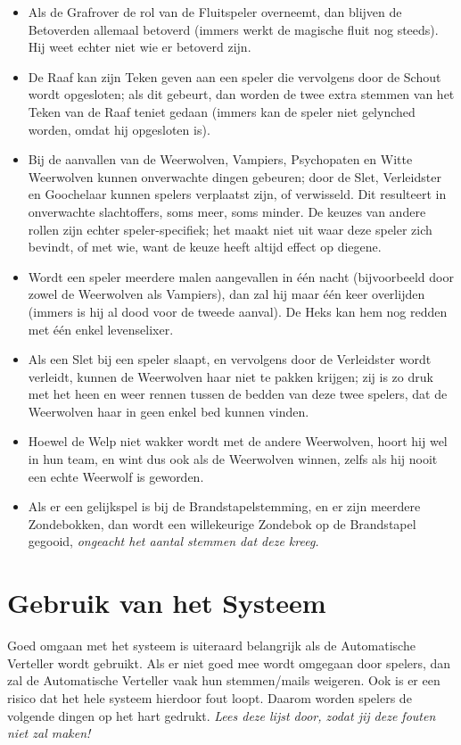 \documentclass[12pt]{article}
\begin{document}
\begin{itemize}
  	\item Als de Grafrover de rol van de Fluitspeler overneemt, dan blijven de Betoverden allemaal betoverd (immers werkt de magische fluit nog steeds). Hij weet echter niet wie er betoverd zijn.
  	\item De Raaf kan zijn Teken geven aan een speler die vervolgens door de Schout wordt opgesloten; als dit gebeurt, dan worden de twee extra stemmen van het Teken van de Raaf teniet gedaan (immers kan de speler niet gelynched worden, omdat hij opgesloten is).
  	\item Bij de aanvallen van de Weerwolven, Vampiers, Psychopaten en Witte Weerwolven kunnen onverwachte dingen gebeuren; door de Slet, Verleidster en Goochelaar kunnen spelers verplaatst zijn, of verwisseld. Dit resulteert in onverwachte slachtoffers, soms meer, soms minder. De keuzes van andere rollen zijn echter speler-specifiek; het maakt niet uit waar deze speler zich bevindt, of met wie, want de keuze heeft altijd effect op diegene.
  	\item Wordt een speler meerdere malen aangevallen in \'e\'en nacht (bijvoorbeeld door zowel de Weerwolven als Vampiers), dan zal hij maar \'e\'en keer overlijden (immers is hij al dood voor de tweede aanval). De Heks kan hem nog redden met \'e\'en enkel levenselixer.
  	\item Als een Slet bij een speler slaapt, en vervolgens door de Verleidster wordt verleidt, kunnen de Weerwolven haar niet te pakken krijgen; zij is zo druk met het heen en weer rennen tussen de bedden van deze twee spelers, dat de Weerwolven haar in geen enkel bed kunnen vinden.
  	\item Hoewel de Welp niet wakker wordt met de andere Weerwolven, hoort hij wel in hun team, en wint dus ook als de Weerwolven winnen, zelfs als hij nooit een echte Weerwolf is geworden.
  	\item Als er een gelijkspel is bij de Brandstapelstemming, en er zijn meerdere Zondebokken, dan wordt een willekeurige Zondebok op de Brandstapel gegooid, \emph{ongeacht het aantal stemmen dat deze kreeg.}
    \end{itemize}

\section{Gebruik van het Systeem}

  Goed omgaan met het systeem is uiteraard belangrijk als de Automatische Verteller wordt gebruikt. Als er niet goed mee wordt omgegaan door spelers, dan zal de Automatische Verteller vaak hun stemmen/mails weigeren. Ook is er een risico dat het hele systeem hierdoor fout loopt. Daarom worden spelers de volgende dingen op het hart gedrukt. \emph{Lees deze lijst door, zodat jij deze fouten niet zal maken!}
  
\end{document}

